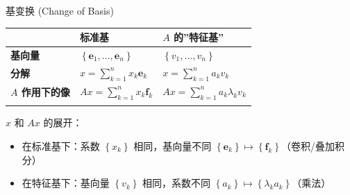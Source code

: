 \documentclass[
  ignorenonframetext,
]{beamer}
\newcounter{none} %
\providecommand{\tightlist}{%
  \setlength{\itemsep}{0pt}\setlength{\parskip}{0pt}}
\begin{document}
\begin{frame}{基变换 (Change of Basis)}
\protect{}\label{ux57faux53d8ux6362-change-of-basis}
{\def\LTcaptype{none} %
\begin{longtable}[]{@{}
  >{\centering\arraybackslash}p{}
  >{\centering\arraybackslash}p{}
  >{\centering\arraybackslash}p{}@{}}
\toprule\noalign{}
\begin{minipage}[b]{\linewidth}\centering
\end{minipage} & \begin{minipage}[b]{\linewidth}\centering
标准基
\end{minipage} & \begin{minipage}[b]{\linewidth}\centering
\(A\) 的''特征基''
\end{minipage} \\
\midrule\noalign{}
\endhead
\textbf{基向量} &
\(\left\{\mathbf{e}_{1}, \ldots, \mathbf{e}_{n}\right\}\) &
\(\left\{v_{1}, \ldots, v_{n}\right\}\) \\
\textbf{分解} & \(x=\sum_{k=1}^{n} x_{k} \mathbf{e}_{k}\) &
\(x=\sum_{k=1}^{n} a_{k} v_{k}\) \\
\textbf{\(A\) 作用下的像} & \(A x=\sum_{k=1}^{n} x_{k} \mathbf{f}_{k}\)
& \(A x=\sum_{k=1}^{n} a_{k} \lambda_{k} v_{k}\) \\
\bottomrule\noalign{}
\end{longtable}
}

\(x\) 和 \(A x\) 的展开：

\begin{itemize}
\tightlist
\item
  在标准基下：系数 \(\left\{x_{k}\right\}\) 相同，基向量不同
  \(\left\{\mathbf{e}_{k}\right\} \mapsto\left\{\mathbf{f}_{k}\right\}\)（卷积/叠加积分）
\item
  在特征基下：基向量 \(\left\{v_{k}\right\}\) 相同，系数不同
  \(\left\{a_{k}\right\} \mapsto\left\{\lambda_{k} a_{k}\right\}\)（乘法）
\end{itemize}
\end{frame}
\end{document}
